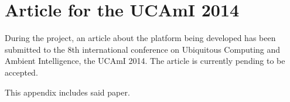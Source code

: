 \chapter{Article for the UCAmI 2014}

During the project, an article about the platform being developed has been submitted to the 8th international conference on Ubiquitous Computing and Ambient Intelligence, the UCAmI 2014. The article is currently pending to be accepted. 

This appendix includes said paper.


